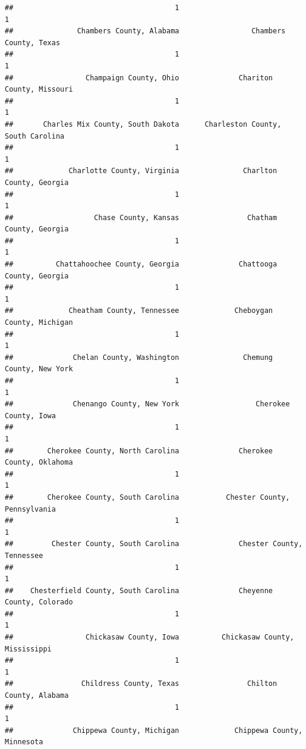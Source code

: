 \documentclass[
]{article}
\begin{document}
\begin{verbatim}
##                                      1                                      1 
##               Chambers County, Alabama                 Chambers County, Texas 
##                                      1                                      1 
##                 Champaign County, Ohio              Chariton County, Missouri 
##                                      1                                      1 
##       Charles Mix County, South Dakota      Charleston County, South Carolina 
##                                      1                                      1 
##             Charlotte County, Virginia               Charlton County, Georgia 
##                                      1                                      1 
##                   Chase County, Kansas                Chatham County, Georgia 
##                                      1                                      1 
##          Chattahoochee County, Georgia              Chattooga County, Georgia 
##                                      1                                      1 
##             Cheatham County, Tennessee             Cheboygan County, Michigan 
##                                      1                                      1 
##              Chelan County, Washington               Chemung County, New York 
##                                      1                                      1 
##              Chenango County, New York                  Cherokee County, Iowa 
##                                      1                                      1 
##        Cherokee County, North Carolina              Cherokee County, Oklahoma 
##                                      1                                      1 
##        Cherokee County, South Carolina           Chester County, Pennsylvania 
##                                      1                                      1 
##         Chester County, South Carolina              Chester County, Tennessee 
##                                      1                                      1 
##    Chesterfield County, South Carolina              Cheyenne County, Colorado 
##                                      1                                      1 
##                 Chickasaw County, Iowa          Chickasaw County, Mississippi 
##                                      1                                      1 
##                Childress County, Texas                Chilton County, Alabama 
##                                      1                                      1 
##              Chippewa County, Michigan             Chippewa County, Minnesota 

\end{verbatim}
\end{document}
